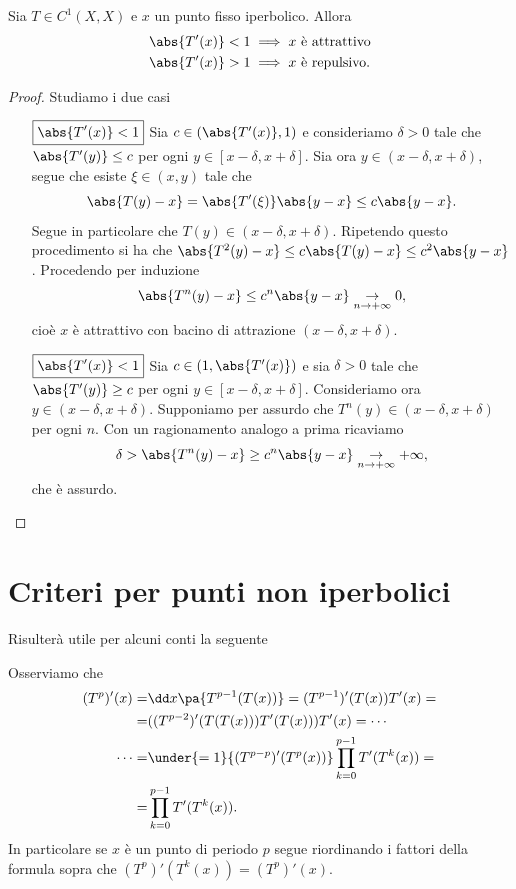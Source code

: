 \begin{proposition}\label{RelazioneTraPuntiIperboliciEAttrattivita}
Sia $T\in C^1(X,X)$ e $x$ un punto fisso iperbolico. Allora 
\begin{align*}
\abs{T'(x)}<1&\implies x\text{ \`e attrattivo}\\
\abs{T'(x)}>1&\implies x\text{ \`e repulsivo.}
\end{align*}
\end{proposition}
\begin{proof}
Studiamo i due casi
\setlength{\leftmargini}{0cm}
\begin{itemize}
\item[$\boxed{\abs{T'(x)}<1}$] Sia $c\in (\abs{T'(x)},1)$ e consideriamo $\delta>0$ tale che $\abs{T'(y)}\leq c$ per ogni $y\in [x-\delta,x+\delta]$. Sia ora $y\in (x-\delta,x+\delta)$, segue che esiste $\xi\in (x,y)$ tale che
\[\abs{T(y)-x}=\abs{T'(\xi)}\abs{y-x}\leq c\abs{y-x}.\]
Segue in particolare che $T(y)\in (x-\delta,x+\delta)$. Ripetendo questo procedimento si ha che $\abs{T^2(y)-x}\leq c\abs{T(y)-x}\leq c^2\abs{y-x}$. Procedendo per induzione
\[\abs{T^n(y)-x}\leq c^n\abs{y-x}\underset{n\to+\infty}{\to} 0,\]
cio\`e $x$ \`e attrattivo con bacino di attrazione $(x-\delta,x+\delta)$.
\item[$\boxed{\abs{T'(x)}<1}$] Sia $c\in (1,\abs{T'(x)})$ e sia $\delta>0$ tale che $\abs{T'(y)}\geq c$ per ogni $y\in [x-\delta,x+\delta]$. Consideriamo ora $y\in (x-\delta,x+\delta)$. Supponiamo per assurdo che $T^n(y)\in (x-\delta,x+\delta)$ per ogni $n$. Con un ragionamento analogo a prima ricaviamo
\[\delta>\abs{T^n(y)-x}\geq c^n\abs{y-x}\underset{n\to+\infty}{\to}+\infty,\]
che \`e assurdo.
\end{itemize}
\setlength{\leftmargini}{0.5cm}
\end{proof}

\section{Criteri per punti non iperbolici}
Risulter\`a utile per alcuni conti la seguente
\begin{remark}
Osserviamo che
\begin{align*}
(T^p)'(x)=&\dd x{}\pa{T^{p-1}(T(x))}=(T^{p-1})'(T(x))T'(x)=\\
=&((T^{p-2})'(T(T(x)))T'(T(x)))T'(x)=\cdots\\
\cdots=&\under{=1}{(T^{p-p})'(T^p(x))}\prod_{k=0}^{p-1}T'(T^k(x))=\\
=&\prod_{k=0}^{p-1}T'(T^k(x)).
\end{align*}
In particolare se $x$ \`e un punto di periodo $p$ segue riordinando i fattori della formula sopra che $(T^p)'(T^k(x))=(T^p)'(x)$.
\end{remark}

